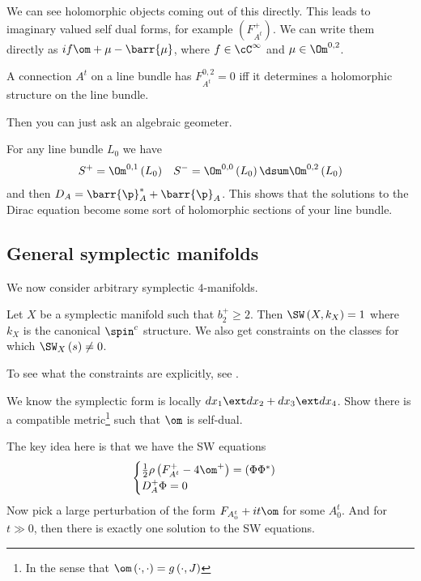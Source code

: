 \documentclass{amsart}
\begin{document}
We can see holomorphic objects coming out of this directly. 
This leads to imaginary valued self dual forms, for example
$\left( F_{A^t}^+ \right)$.
We can write them directly as $i f \om + \mu - \barr{\mu}$, where $f\in \cC^\infty$
and $\mu\in \Om^{0,2}$.

\begin{fact}
A connection $A^t$ on a line bundle has $F_{A^t}^{0,2} = 0$ iff
it determines a holomorphic structure on the line bundle.
\end{fact}
Then you can just ask an algebraic geometer.

For any line bundle $L_0$ we have
\begin{align}
S^+ = \Om^{0,1}\left( L_0 \right)&&
S^- = \Om^{0,0}\left( L_0 \right) \dsum
\Om^{0,2}\left( L_0 \right)
\end{align}
and then $D_A = \barr{\p}_A^* + \barr{\p}_A$. 
This shows that the solutions to the Dirac equation become some sort of holomorphic sections
of your line bundle.

\subsection{General symplectic manifolds}

We now consider arbitrary symplectic $4$-manifolds.

\begin{thm}
Let $X$ be a symplectic manifold such that $b_2^+ \geq 2$. 
Then $\SW\left( X , k_X \right) = 1$ where $k_X$ is the canonical $\spin^c$ structure.
We also get constraints on the classes for which $\SW_X\left( s \right) \neq 0$.
\end{thm}

To see what the constraints are explicitly, see \cite{hutchings_taubes_sw}.


\begin{exr}
We know the symplectic form is locally
$dx_1 \ext dx_2 + dx_3 \ext dx_4$. 
Show there is a compatible metric\footnote{
In the sense that $\om\left( \cdot , \cdot \right) = g\left( \cdot , J \right)$}
such that $\om$ is self-dual.
\end{exr}

The key idea here is that we have the SW equations
\begin{equation}
\begin{cases}
\frac{1}{2}\rho\left( F_{A^t}^+ - 4\om^+ \right) = \left( \Phi \Phi^* \right) 
\\
D^+_A \Phi = 0
\end{cases}
\end{equation}
Now pick a large perturbation of the form $F_{A_0^t} + it\om$ for some $A_0^t$. 
And for $t \gg 0$, then there is exactly one solution to the SW equations.
\end{document}
